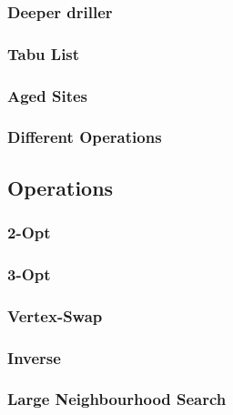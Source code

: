 \subsubsection{Deeper driller}

\subsubsection{Tabu List}


\subsubsection{Aged Sites}


\subsubsection{Different Operations}

\subsection{Operations}

\subsubsection{2-Opt}

\subsubsection{3-Opt}

\subsubsection{Vertex-Swap}

\subsubsection{Inverse}

\subsubsection{Large Neighbourhood Search}

